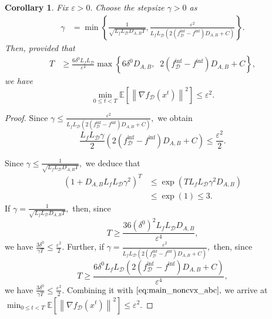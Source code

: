 \documentclass{article}
\newcommand{\bb}{\mathbb}
\newcommand{\Exp}[1]{{\bb E}\left[#1\right]}
\theoremstyle{plain}
\newtheorem{corollary}{Corollary}
\newcommand{\tf}{f_{\mathcal{D}}}
\theoremstyle{plain}
\theoremstyle{definition}
\theoremstyle{remark}
\begin{document}
\begin{corollary}
	Fix $\varepsilon>0.$ Choose the stepsize $\gamma>0$ as
	\begin{equation*}
		\begin{split}
			\gamma &= \min\left\lbrace \frac{1}{\sqrt{L_fL_{\mathcal{D}}D_{A,B} T}}, \frac{\varepsilon^2}{L_fL_{\mathcal{D}}\left(2\left(\tf^{\inf} - 	f^{\inf}\right)D_{A,B} + C\right)} \right\rbrace.
		\end{split}
	\end{equation*}
	Then, provided that
	\begin{equation*}
		\begin{split}
			T & \geq \frac{6\delta^0L_fL_{\mathcal{D}}}{\varepsilon^4}\max\left\lbrace 6\delta^0D_{A,B},\;\;2\left(\tf^{\inf} - 	f^{\inf}\right)D_{A,B} + C\right\rbrace,
		\end{split}
	\end{equation*}
	we have
	\begin{equation*}
		\min_{0 \leq t < T}\Exp{\left\|\nabla \tf(x^t)\right\|^2}\leq\varepsilon^2.
	\end{equation*}
\end{corollary}
\begin{proof}
	Since $\gamma \leq \frac{\varepsilon^2}{L_fL_{\mathcal{D}}\left(2\left(\tf^{\inf} - 	f^{\inf}\right)D_{A,B} + C\right)},$ we obtain
	\begin{equation*}
		\frac{L_fL_{\mathcal{D}}\gamma}{2}\left(2\left(\tf^{\inf} - 	f^{\inf}\right)D_{A,B} + C\right) \leq \frac{\varepsilon^2}{2}.
	\end{equation*}

	Since $\gamma\leq \frac{1}{\sqrt{L_fL_{\mathcal{D}}D_{A,B} T}},$ we deduce that
	\begin{equation*}
		\begin{split}
			\left(1+D_{A,B}L_fL_{\mathcal{D}}\gamma^2\right)^T &\leq \exp\left(TL_fL_{\mathcal{D}}\gamma^2D_{A,B}\right)\\
			&\leq\exp(1)\leq 3.
		\end{split}
	\end{equation*}
	If $\gamma = \frac{1}{\sqrt{L_fL_{\mathcal{D}}D_{A,B} T}},$ then, since
	\begin{equation*}
		T\geq \frac{36\left(\delta^0\right)^2L_fL_{\mathcal{D}}D_{A,B}}{\varepsilon^4},
	\end{equation*}
	we have $\frac{3\delta^0}{\gamma T}\leq \frac{\varepsilon^2}{2}.$ Further, if $\gamma= \frac{\varepsilon^2}{L_fL_{\mathcal{D}}\left(2\left(\tf^{\inf} - 	f^{\inf}\right)D_{A,B} + C\right)},$ then, since
	\begin{equation*}
		T\geq \frac{6\delta^0L_fL_{\mathcal{D}}\left(2\left(\tf^{\inf} - 	f^{\inf}\right)D_{A,B} + C\right)}{\varepsilon^4},
	\end{equation*}
	we have $\frac{3\delta^0}{\gamma T}\leq \frac{\varepsilon^2}{2}.$
	Combining it with $\eqref{eq:main_noncvx_abc},$ we arrive at $\min_{0 \leq t < T}\Exp{\left\|\nabla \tf(x^t)\right\|^2}\leq\varepsilon^2.$
\end{proof}
\end{document}
